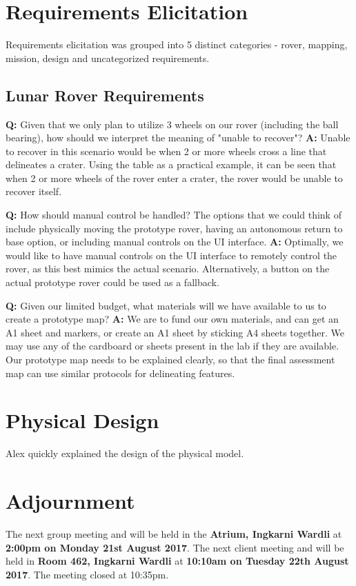 \documentclass{article}
\begin{document}
\section{Requirements Elicitation}
	Requirements elicitation was grouped into 5 distinct categories - rover, mapping, mission, design and uncategorized requirements. 
    
    \subsection{Lunar Rover Requirements}
    	\textbf{Q:} Given that we only plan to utilize 3 wheels on our rover (including the ball bearing), how should we interpret the meaning of "unable to recover"? \newline
        \textbf{A:} Unable to recover in this scenario would be when 2 or more wheels cross a line that delineates a crater. Using the table as a practical example, it can be seen that when 2 or more wheels of the rover enter a crater, the rover would be unable to recover itself.\newline
    
    	\textbf{Q:} How should manual control be handled? The options that we could think of include physically moving the prototype rover, having an autonomous return to base option, or including manual controls on the UI interface. \newline
        \textbf{A:} Optimally, we would like to have manual controls on the UI interface to remotely control the rover, as this best mimics the actual scenario. Alternatively, a button on the actual prototype rover could be used as a fallback. \newline   
        
        \textbf{Q:} Given our limited budget, what materials will we have available to us to create a prototype map?  \newline
        \textbf{A:} We are to fund our own materials, and can get an A1 sheet and markers, or create an  A1 sheet by sticking A4 sheets together. We may use any of the cardboard or sheets present in the lab if they are available. Our prototype map needs to be explained clearly, so that the final assessment map can use similar protocols for delineating features. \newline  
\section{Physical Design}
	Alex quickly explained the design of the physical model.        
         
\section{Adjournment}
	The next group meeting and will be held in the {\bf Atrium, Ingkarni Wardli} at {\bf 2:00pm on Monday 21st August 2017}.\newline
    The next client meeting and will be held in {\bf Room 462, Ingkarni Wardli} at {\bf 10:10am on Tuesday 22th August 2017}.\newline
The meeting closed at 10:35pm.
\end{document}
